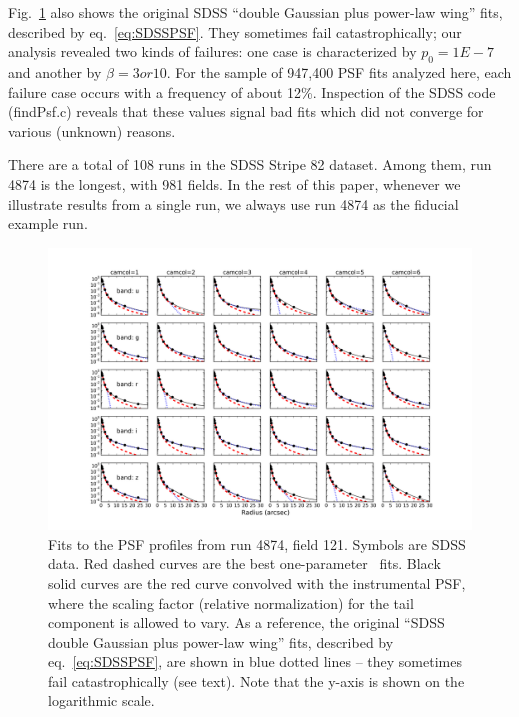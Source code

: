 Fig.~\ref{fig:psffit} also shows the original SDSS ``double Gaussian plus power-law wing'' fits,
described by eq.~\ref{eq:SDSSPSF}. They sometimes fail catastrophically; our analysis revealed
two kinds of failures: one case is characterized by $p_0 =1E-7$ and
another by $\beta=3 or 10$.
For the sample of 947,400 PSF fits analyzed here, each failure case occurs with a frequency of about 12\%. 
Inspection of the SDSS code (findPsf.c) reveals that these values signal bad fits which did not 
converge for various (unknown) reasons. 

There are a total of 108 runs in the SDSS Stripe 82 dataset. Among them, run 4874 is the longest, 
with 981 fields. In the rest of this paper, whenever we illustrate results from a single run, 
we always use run 4874 as the fiducial example run. 


\begin{figure}[th]
\centering
\includegraphics[width=1.0\textwidth]{FIGURES/psffit.png}
\vskip -0.3in
\caption{Fits to the PSF profiles from run 4874, field 121. Symbols are SDSS data. 
  Red dashed curves are the best one-parameter \vk~fits. Black solid curves are the red
  curve convolved with the instrumental PSF, where the scaling factor
  (relative normalization) 
  for the tail component is allowed to vary. 
As a reference, the original ``SDSS double Gaussian plus power-law wing'' fits,
described by eq.~\ref{eq:SDSSPSF}, 
 are shown in blue dotted lines -- they sometimes fail catastrophically (see text). 
Note that the y-axis is shown on the logarithmic scale.
\label{fig:psffit}}
\end{figure}


